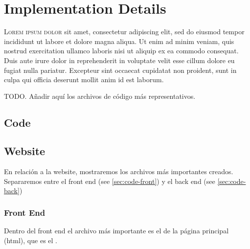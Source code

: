 

\chapter{Implementation Details}\label{cha:code}



\lettrine{L}{orem ipsum dolor} sit amet, consectetur adipiscing elit, sed do
eiusmod tempor incididunt ut labore et dolore magna aliqua. Ut enim ad minim
veniam, quis nostrud exercitation ullamco laboris nisi ut aliquip ex ea commodo
consequat. Duis aute irure dolor in reprehenderit in voluptate velit esse
cillum dolore eu fugiat nulla pariatur. Excepteur sint occaecat cupidatat non
proident, sunt in culpa qui officia deserunt mollit anim id est laborum.

TODO. Añadir aquí los archivos de código más representativos.



\section{Code}







\section{Website}

En relación a la website, mostraremos los archivos más importantes
creados. Separaremos entre el front end (see \vref{sec:code-front}) y el back
end (see \vref{sec:code-back})

\subsection{Front End}\label{sec:code-front}

Dentro del front end el archivo más importante es el de la página principal
(\acs{html}), que es el .


